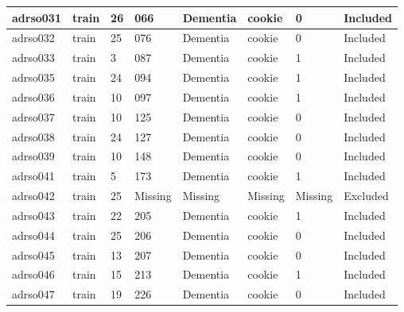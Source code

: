\begin{center}
\begin{longtable}{|l|l|l|l|l|l|l|l|}
adrso031  & train            & 26           & 066         & Dementia             & cookie          & 0                & Included      \\ \hline
adrso032  & train            & 25           & 076         & Dementia             & cookie          & 0                & Included      \\ \hline
adrso033  & train            & 3            & 087         & Dementia             & cookie          & 1                & Included      \\ \hline
adrso035  & train            & 24           & 094         & Dementia             & cookie          & 1                & Included      \\ \hline
adrso036  & train            & 10           & 097         & Dementia             & cookie          & 1                & Included      \\ \hline
adrso037  & train            & 10           & 125         & Dementia             & cookie          & 0                & Included      \\ \hline
adrso038  & train            & 24           & 127         & Dementia             & cookie          & 0                & Included      \\ \hline
adrso039  & train            & 10           & 148         & Dementia             & cookie          & 0                & Included      \\ \hline
adrso041  & train            & 5            & 173         & Dementia             & cookie          & 1                & Included      \\ \hline
adrso042  & train            & 25           & Missing     & Missing              & Missing         & Missing          & Excluded      \\ \hline
adrso043  & train            & 22           & 205         & Dementia             & cookie          & 1                & Included      \\ \hline
adrso044  & train            & 25           & 206         & Dementia             & cookie          & 0                & Included      \\ \hline
adrso045  & train            & 13           & 207         & Dementia             & cookie          & 0                & Included      \\ \hline
adrso046  & train            & 15           & 213         & Dementia             & cookie          & 1                & Included      \\ \hline
adrso047  & train            & 19           & 226         & Dementia             & cookie          & 0                & Included      \\ \hline

\end{longtable}
\end{center}
